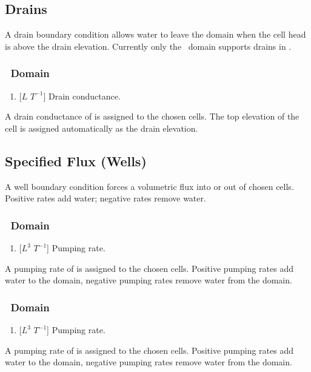 \subsection{Drains}
A drain boundary condition allows water to leave the domain when the cell head is above the drain elevation. Currently only the \gwf\ domain supports drains in \mut.

\subsubsection{\gwf\ Domain}
    {
        \squish
        \begin{enumerate}
        \item {}  [$L$ $T^{-1}$]  Drain conductance.
        \end{enumerate}
          A drain conductance of  is assigned to the chosen cells.  The top elevation of the cell is assigned automatically as the drain elevation.
    }

\subsection{Specified Flux (Wells)}
A well boundary condition forces a volumetric flux into or out of chosen cells. Positive rates add water; negative rates remove water.

\subsubsection{\gwf\ Domain}
    {
        \squish
        \begin{enumerate}
            \item {} [$L^{3}$ $T^{-1}$]  Pumping rate.
        \end{enumerate}
        A pumping rate of  is assigned to the chosen cells. Positive pumping rates add water to the domain, negative pumping rates remove water from the domain.
    }

\subsubsection{\swf\ Domain}
    {
        \squish
        \begin{enumerate}
            \item {} [$L^{3}$ $T^{-1}$]  Pumping rate.
        \end{enumerate}
        A pumping rate of  is assigned to the chosen cells.  Positive pumping rates add water to the domain, negative pumping rates remove water from the domain.
    }

